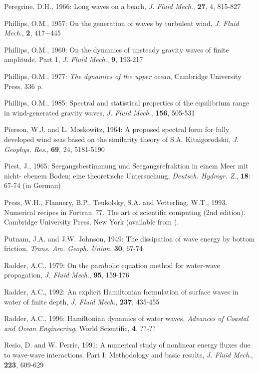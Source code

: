 \documentclass[12pt]{book}
\newcommand{\hl}[1]{\htmladdnormallink{{\it #1}}{#1}}
\begin{document}
\begin{thebibliography}{10}
Peregrine, D.H., 1966: Long waves on a beach, {\it J. Fluid Mech}., {\bf 27}, 4, 815-827

Phillips, O.M., 1957: On the generation of waves by turbulent wind, {\it J. Fluid Mech}., {\bf 2}, 417$-$445

Phillips, O.M., 1960: On the dynamics of unsteady gravity waves of finite amplitude. Part 1, {\it J. Fluid Mech}.,
{\bf 9}, 193-217

Phillips, O.M., 1977: {\it The dynamics of the upper ocean}, Cambridge University Press, 336 p.

Phillips, O.M., 1985: Spectral and statistical properties of the equilibrium range in wind-generated gravity
waves, {\it J. Fluid Mech}., {\bf 156}, 505-531

Pierson, W.J. and L. Moskowitz, 1964: A proposed spectral form for fully developed wind seas based on
the similarity theory of S.A. Kitaigorodskii, {\it J. Geophys. Res}., {\bf 69}, 24, 5181-5190

Piest, J., 1965: Seegangsbestimmung und Seegangsrefraktion in einem Meer mit nicht- ebenem Boden;
eine theoretische Untersuchung, {\it Deutsch. Hydrogr. Z}., {\bf 18}: 67-74 (in German)

Press, W.H., Flannery, B.P., Teukolsky, S.A. and Vetterling, W.T., 1993. Numerical recipes in Fortran~77.
The art of scientific computing (2nd edition). Cambridge University Press, New York (available from
\hl{http://www.nr.com}).

Putnam, J.A. and J.W. Johnson, 1949: The dissipation of wave energy by bottom friction, {\it Trans. Am.
Geoph. Union}, {\bf 30}, 67-74

Radder, A.C., 1979: On the parabolic equation method for water-wave propagation, {\it J. Fluid Mech}., {\bf 95},
159-176

Radder, A.C., 1992: An explicit Hamiltonian formulation of surface waves in water of finite depth, {\it J. Fluid
Mech.}, {\bf 237}, 435-455

Radder, A.C., 1996: Hamiltonian dynamics of water waves, {\it Advances of Coastal and Ocean Engineering},
World Scientific, {\bf 4}, ??-??

Resio, D. and W. Perrie, 1991: A numerical study of nonlinear energy fluxes due to wave-wave
interactions. Part I: Methodology and basic results, {\it J. Fluid Mech}., {\bf 223}, 609-629


\end{thebibliography}
\end{document}
